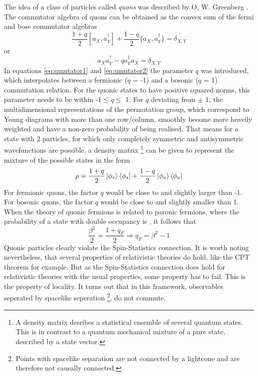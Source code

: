 The idea of a class of particles called \textit{quons} was described by O. W. Greenberg \cite{Greenberg1991}.  The commutator algebra of quons can be obtained as the convex sum of the fermi and bose commutator algebras
\begin{equation}
\label{eq:qmutator1}
 \frac{1+q}{2}[a_{X},a_{Y}^{\dag}]+\frac{1-q}{2}\{a_{X},a_{Y}^{\dag}\} = \delta_{X,Y}
\end{equation} 
or 
\begin{equation}
\label{eq:qmutator2}
 a_{X}a_{Y}^{\dag} - q a_{Y}^{\dag} a_{X} = \delta_{X,Y}
\end{equation} 
In equations \ref{eq:qmutator1} and \ref{eq:qmutator2} the parameter $q$ was introduced, which interpolates between a fermionic ($q$ = -1) and a bosonic ($q$ = 1) commutation relation. For the quonic states to have positive squared norms, this parameter needs to be within -1$\leq q \leq$ 1. For $q$ deviating from $\pm$ 1, the multidimensional representations of the permutation group, which correspond to Young diagrams with more than one row/column, smoothly become more heavily weighted and have a non-zero probability of being realised. That means for a state with 2 particles, for which only completely symmetric and antisymmetric wavefunctions are possible, a density matrix \footnote{A density matrix desribes a statistical ensemble of several quantum states. This is in contrast to a quantum mechanical mixture of a pure state, described by a state vector.} can be given to represent the mixture of the possible states in the form
\begin{equation}
 \rho = \frac{1+q}{2}\ket{\phi_{s}}\bra{\phi_{s}} + \frac{1-q}{2}\ket{\phi_{a}}\bra{\phi_{a}}
\end{equation} 
For fermionic quons, the factor $q$ would be close to and slightly larger than -1. For bosonic quons, the factor $q$ would be close to and slightly smaller than 1. When the theory of quonic fermions is related to paronic fermions, where the probability of a state with double occupancy is \betatwo, it follows that
\begin{equation}
 \frac{\beta^{2}}{2} = \frac{1+q_{F}}{2} \Rightarrow q_{F} = \beta^{2} - 1
\end{equation} 
Quonic particles clearly violate the Spin-Statistics connection. It is worth noting nevertheless, that several properties of relativistic theories do hold, like the CPT theorem for example. But as the Spin-Statistics connection does hold for relativistic theories with the usual properties, some property has to fail. This is the property of locality. It turns out that in this framework, observables seperated by spacelike seperation \footnote{Points with spacelike separation are not connected by a lightcone and are therefore not causally connected.}, do not commute.


